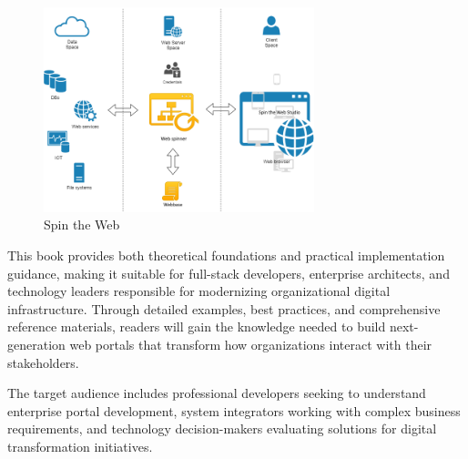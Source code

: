 \begin{figure}[h]
\centering
\includegraphics[width=0.7\textwidth]{figures/spin-the-web.png}
\caption{Spin the Web}
\label{fig:spin-the-web}
\end{figure}

This book provides both theoretical foundations and practical implementation guidance, making it suitable for full-stack developers, enterprise architects, and technology leaders responsible for modernizing organizational digital infrastructure. Through detailed examples, best practices, and comprehensive reference materials, readers will gain the knowledge needed to build next-generation web portals that transform how organizations interact with their stakeholders.

The target audience includes professional developers seeking to understand enterprise portal development, system integrators working with complex business requirements, and technology decision-makers evaluating solutions for digital transformation initiatives.

\clearpage
